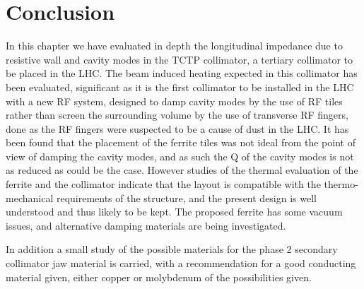 \section{Conclusion}

In this chapter we have evaluated in depth the longitudinal impedance due to resistive wall and cavity modes in the TCTP collimator, a tertiary collimator to be placed in the LHC. The beam induced heating expected in this collimator has been evaluated, significant as it is the first collimator to be installed in the LHC with a new RF system, designed to damp cavity modes by the use of RF tiles rather than screen the surrounding volume by the use of transverse RF fingers, done as the RF fingers were suspected to be a cause of dust in the LHC. It has been found that the placement of the ferrite tiles was not ideal from the point of view of damping the cavity modes, and as such the Q of the cavity modes is not as reduced as could be the case. However studies of the thermal evaluation of the ferrite and the collimator indicate that the layout is compatible with the thermo-mechanical requirements of the structure, and the present design is well understood and thus likely to be kept. The proposed ferrite has some vacuum issues, and alternative damping materials are being investigated.

In addition a small study of the possible materials for the phase 2 secondary collimator jaw material is carried, with a recommendation for a good conducting material given, either copper or molybdenum of the possibilities given.